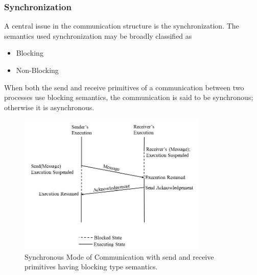 \documentclass{beamer}
\begin{document}
\begin{frame}[allowframebreaks]
	\frametitle{Synchronization}
	A central issue in the communication structure is the synchronization. The semantics    
	used synchronization may be broadly classified as
	\begin{itemize}
		\item Blocking
		\item Non-Blocking
	\end{itemize}
	When both the send and receive primitives of a communication between two processes use 
	blocking semantics, the communication is said to be synchronous; otherwise it is 
	asynchronous.
	\vspace{2cm}
	\framebreak
	\begin{figure}
		\centering
		\includegraphics[width=9cm]{synchronousMode.jpg}
		\caption{Synchronous Mode of Communication with send and receive primitives having 
		blocking type semantics.}
	\end{figure}
\end{frame}
\end{document}
